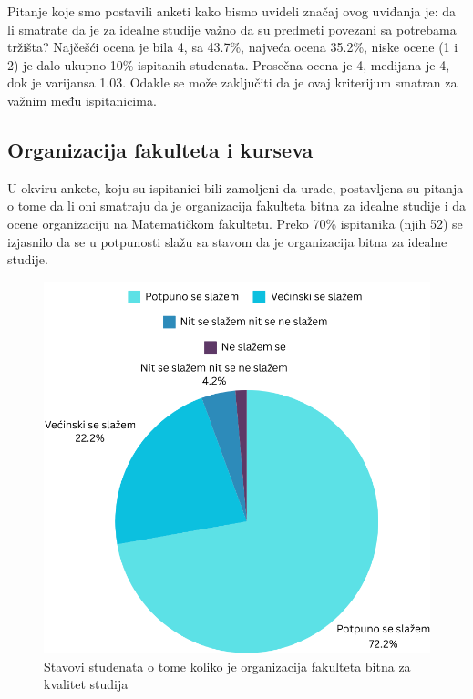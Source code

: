 \documentclass[a4paper]{article}
\begin{document}
{Pitanje koje smo postavili anketi kako bismo uvideli značaj ovog uviđanja je: da li smatrate da je za idealne studije važno da su predmeti povezani sa potrebama tržišta? Najčešći ocena je bila 4, sa 43.7\%, najveća ocena 35.2\%, niske ocene (1 i 2) je dalo ukupno 10\% ispitanih studenata. Prosečna ocena je 4, medijana je 4, dok je varijansa 1.03. Odakle se može zaključiti da je ovaj kriterijum smatran za važnim među ispitanicima.


\subsection{Organizacija fakulteta i kurseva}
\label{subsec:organizacija_stavovi}

U okviru ankete, koju su ispitanici bili zamoljeni da urade, postavljena su pitanja o tome da li oni smatraju da je organizacija fakulteta bitna za idealne studije i da ocene organizaciju na Matematičkom fakultetu. Preko 70\% ispitanika (njih 52) se izjasnilo da se u potpunosti slažu sa stavom da je organizacija bitna za idealne studije.
\begin{figure}[h!]
\begin{center}
    \includegraphics[scale = 0.3]{PieChartOrganizacija.png}
    \caption{Stavovi studenata o tome koliko je organizacija fakulteta bitna za kvalitet studija}
    \label{fig:organizacija}
\end{center}
\end{figure}

}
\end{document}
